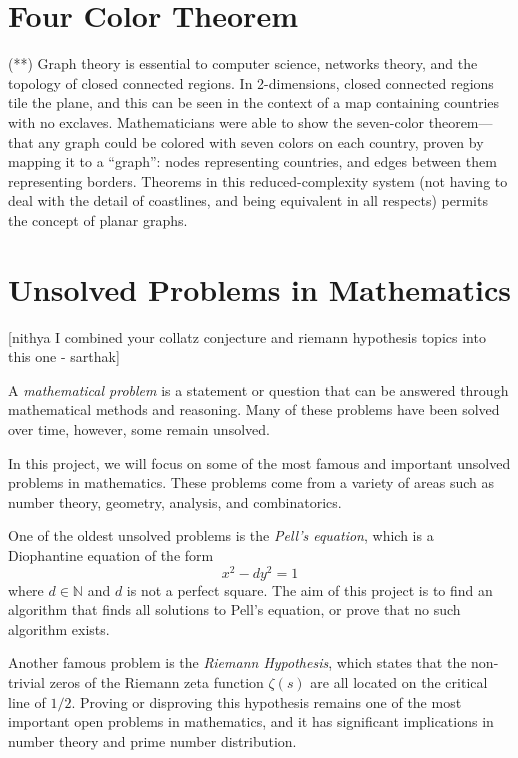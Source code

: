 \documentclass{article}
\begin{document}
\section{Four Color Theorem} (**)
    Graph theory is essential to computer science, networks theory, and the topology of closed connected regions.
    In 2-dimensions, closed connected regions tile the plane, and this can be seen in the context of a map containing countries with no exclaves.
    Mathematicians were able to show the seven-color theorem---that any graph could be colored with seven colors on each country, proven by mapping it to a ``graph'': nodes representing countries, and edges between them representing borders.
    Theorems in this reduced-complexity system (not having to deal with the detail of coastlines, and being equivalent in all respects) permits the concept of planar graphs.

\section{Unsolved Problems in Mathematics}
    [nithya  I combined your collatz conjecture and riemann hypothesis topics into this one - sarthak]
    
    A \textit{mathematical problem} is a statement or question that can be answered through mathematical methods and reasoning. Many of these problems have been solved over time, however, some remain unsolved.
    
    
    \vspace{3mm}
    In this project, we will focus on some of the most famous and important unsolved problems in mathematics. These problems come from a variety of areas such as number theory, geometry, analysis, and combinatorics. 
    
    \vspace{3mm}
    One of the oldest unsolved problems is the \textit{Pell's equation}, which is a Diophantine equation of the form $$x^2 - dy^2 = 1$$ where $d \in \mathbb{N}$ and $d$ is not a perfect square. The aim of this project is to find an algorithm that finds all solutions to Pell's equation, or prove that no such algorithm exists.
    
    \vspace{3mm}
    Another famous problem is the \textit{Riemann Hypothesis}, which states that the non-trivial zeros of the Riemann zeta function $\zeta(s)$ are all located on the critical line of $1/2$. Proving or disproving this hypothesis remains one of the most important open problems in mathematics, and it has significant implications in number theory and prime number distribution. 
    
\end{document}
